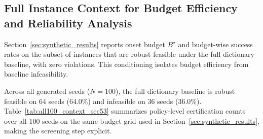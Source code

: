 \documentclass[accepted]{uai2026}
\theoremstyle{plain}
\theoremstyle{definition}
\theoremstyle{remark}
\begin{document}




\subsection{Full Instance Context for Budget Efficiency and Reliability Analysis}
\label{app:all100_sec53}

Section~\ref{sec:synthetic_results} reports onset budget $B^\star$ and budget-wise success rates on the subset of instances that are robust feasible under the full dictionary baseline, with zero violations. This conditioning isolates budget efficiency from baseline infeasibility.

Across all generated seeds ($N=100$), the full dictionary baseline is robust feasible on 64 seeds (64.0\%) and infeasible on 36 seeds (36.0\%). Table~\ref{tab:all100_context_sec53} summarizes policy-level certification counts over all 100 seeds on the same budget grid used in Section~\ref{sec:synthetic_results}, making the screening step explicit.
\end{document}
